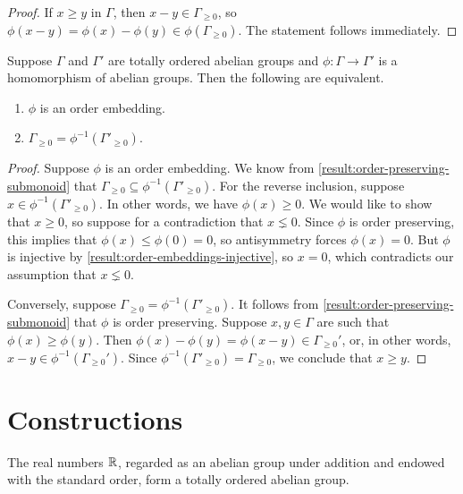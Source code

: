 \begin{proof}
If $x \geq y$ in $\Gamma$, then $x - y \in \Gamma_{\geq 0}$, so $\phi(x-y) = \phi(x)-\phi(y) \in \phi(\Gamma_{\geq 0})$. The statement follows immediately.
\end{proof}

\begin{lemma}
\label{result:order-embedding-submonoid}
Suppose $\Gamma$ and $\Gamma'$ are totally ordered abelian groups and $\phi : \Gamma \to \Gamma'$ is a homomorphism of abelian groups. Then the following are equivalent.
\begin{enumerate}[label=(\alph{*})]
\item $\phi$ is an order embedding.
\item $\Gamma_{\geq 0} = \phi^{-1}(\Gamma'_{\geq 0})$. 
\end{enumerate}
\end{lemma}

\begin{proof}
Suppose $\phi$ is an order embedding. We know from \cref{result:order-preserving-submonoid} that $\Gamma_{\geq 0} \subseteq \phi^{-1}(\Gamma'_{\geq 0})$. For the reverse inclusion, suppose $x \in \phi^{-1}(\Gamma'_{\geq 0})$. In other words, we have $\phi(x) \geq 0$. We would like to show that $x \geq 0$, so suppose for a contradiction that $x \lneq 0$. Since $\phi$ is order preserving, this implies that $\phi(x) \leq \phi(0) = 0$, so antisymmetry forces $\phi(x) = 0$.  But $\phi$ is injective by \cref{result:order-embeddings-injective}, so $x = 0$, which contradicts our assumption that $x \lneq 0$.

Conversely, suppose $\Gamma_{\geq 0} = \phi^{-1}(\Gamma'_{\geq 0})$. It follows from \cref{result:order-preserving-submonoid} that $\phi$ is order preserving. Suppose $x, y \in \Gamma$ are such that $\phi(x) \geq \phi(y)$. Then $\phi(x) - \phi(y) = \phi(x-y) \in \Gamma_{\geq 0}'$, or, in other words, $x - y \in \phi^{-1}(\Gamma_{\geq 0}')$. Since $\phi^{-1}(\Gamma'_{\geq 0}) = \Gamma_{\geq 0}$, we conclude that $x \geq y$. 
\end{proof}

\section{Constructions}

\begin{example}
The real numbers $\mathbb{R}$, regarded as an abelian group under addition and endowed with the standard order, form a totally ordered abelian group. 
\end{example}

